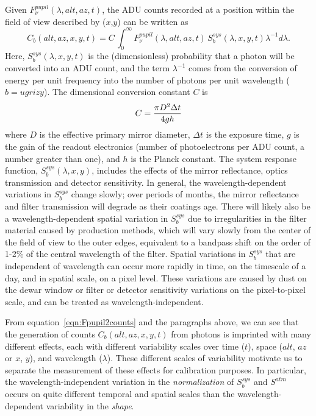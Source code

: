 \documentclass[12pt,preprint]{aastex}
\begin{document}
Given $F_\nu^{pupil}(\lambda,alt,az,t)$, the ADU counts recorded at a
position within the field of view described by ($x$,$y$) can be
written as
\begin{equation}
\label{eqn:Fpupil2counts}
    C_b(alt,az,x,y,t) = C \, \int_0^\infty {F_\nu^{pupil}(\lambda,alt,az,t) \, S_b^{sys}(\lambda,x,y,t) \lambda^{-1}d\lambda}.
\end{equation}
Here, $S_b^{sys}(\lambda,x,y,t)$ is the (dimensionless) probability
that a photon will be converted into an ADU count, and the term
$\lambda^{-1}$ comes from the conversion of energy per unit frequency
into the number of photons per unit wavelength ($b=ugrizy$). The
dimensional conversion constant $C$ is
\begin{equation}
\label{eqn:Cconstant}
        C = {\pi D^2 \Delta t \over 4 g h }  
\end{equation}
where $D$ is the effective primary mirror diameter, $\Delta t$ is the
exposure time, $g$ is the gain of the readout electronics (number of
photoelectrons per ADU count, a number greater than one), and $h$ is
the Planck constant. The system response function,
$S_b^{sys}(\lambda,x,y)$, includes the effects of the mirror
reflectance, optics transmission and detector sensitivity. In general,
the wavelength-dependent variations in $S_b^{sys}$ change slowly; over
periods of months, the mirror reflectance and filter transmission will
degrade as their coatings age. There will likely also be a
wavelength-dependent spatial variation in $S_b^{sys}$ due to
irregularities in the filter material caused by production methods,
which will vary slowly from the center of the field of view to the
outer edges, equivalent to a bandpass shift on the order of 1-2\% of
the central wavelength of the filter. Spatial variations in $S_b^{sys}$ that are
independent of wavelength can occur more rapidly in time, on the
timescale of a day, and in spatial scale, on a pixel level. These
variations are caused by dust on the dewar window or filter or
detector sensitivity variations on the pixel-to-pixel scale, and can
be treated as wavelength-independent.

From equation~\ref{eqn:Fpupil2counts} and the paragraphs above, we can
see that the generation of counts $C_b(alt,az,x,y,t)$ from photons is
imprinted with many different effects, each with different variability
scales over time ($t$), space ($alt$, $az$ or $x$, $y$), and
wavelength ($\lambda$). These different scales of variability motivate
us to separate the measurement of these effects for calibration
purposes. In particular, the 
wavelength-independent variation in the {\it normalization} of $S_b^{sys}$ and $S^{atm}$
occurs on quite different temporal and spatial scales than the
wavelength-dependent variability in the {\it
shape}.
\end{document}
